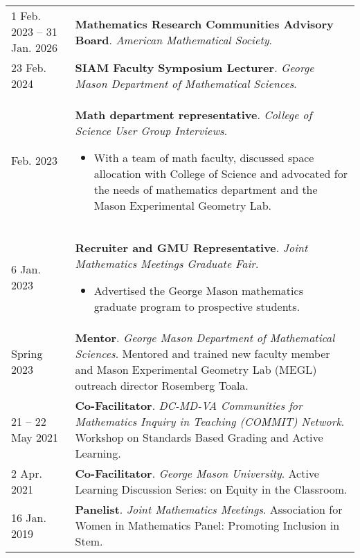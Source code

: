     \begin{center}
    {
    \renewcommand{\arraystretch}{1.2}
    \begin{longtable}{p{}  p{}}
    1 Feb.  2023 -- 31 Jan.  2026 & \textbf{Mathematics Research Communities Advisory Board}. \textit{American Mathematical Society}.  \\ 
23 Feb.  2024 & \textbf{SIAM Faculty Symposium Lecturer}. \textit{George Mason Department of Mathematical Sciences}.  \\ 
 Feb.  2023 & \textbf{Math department representative}. \textit{College of Science User Group Interviews}. 
        \hspace{-1em}

        {\small
        \begin{itemize}
        \setlength{\parindent}{0em}
        \item[] With a team of math faculty, discussed space allocation with College of Science and advocated for the needs of mathematics department and the Mason Experimental Geometry Lab.
        \end{itemize}
        }
        \vspace{-1em}
         \\ 
6 Jan.  2023 & \textbf{Recruiter and GMU Representative}. \textit{Joint Mathematics Meetings Graduate Fair}. 
        \hspace{-1em}

        {\small
        \begin{itemize}
        \setlength{\parindent}{0em}
        \item[] Advertised the George Mason mathematics graduate program to prospective students.
        \end{itemize}
        }
        \vspace{-1em}
         \\ 
  Spring 2023 & \textbf{Mentor}. \textit{George Mason Department of Mathematical Sciences}.  Mentored and trained new faculty member and Mason Experimental Geometry Lab (MEGL) outreach director Rosemberg Toala.  \\ 
21  -- 22 May  2021 & \textbf{Co-Facilitator}. \textit{DC-MD-VA Communities for Mathematics Inquiry in Teaching (COMMIT) Network}.  Workshop on Standards Based Grading and Active Learning.  \\ 
2 Apr.  2021 & \textbf{Co-Facilitator}. \textit{George Mason University}.  Active Learning Discussion Series: on Equity in the Classroom.  \\ 
16 Jan.  2019 & \textbf{Panelist}. \textit{Joint Mathematics Meetings}.  Association for Women in Mathematics Panel: Promoting Inclusion in Stem.  
    \end{longtable}
    } 
    \end{center}

